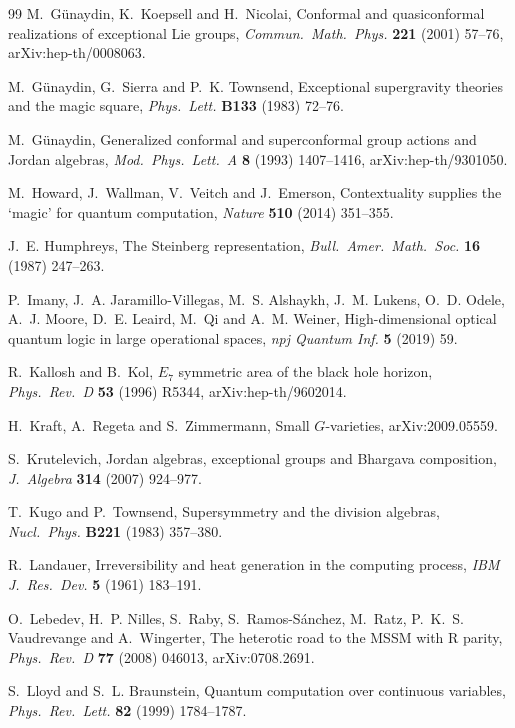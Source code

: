 \begin{thebibliography}{99}
 M.~G\"unaydin, K.~Koepsell and H.~Nicolai, Conformal and quasiconformal
realizations of exceptional Lie groups, \emph{Commun.\ Math.\ Phys.} \textbf{221} (2001)
57--76, arXiv:hep-th/0008063.

 M.~G\"unaydin, G.~Sierra and P.~K. Townsend, Exceptional supergravity
theories and the magic square, \emph{Phys.\ Lett.} \textbf{B133} (1983) 72--76.

 M.~G\"unaydin, Generalized conformal and superconformal group actions
and Jordan algebras, \emph{Mod.\ Phys.\ Lett.\ A} \textbf{8} (1993) 1407--1416,
arXiv:hep-th/9301050.

 M.~Howard, J.~Wallman, V.~Veitch and J.~Emerson, Contextuality supplies
the `magic' for quantum computation, \emph{Nature} \textbf{510} (2014) 351--355.

 J.~E. Humphreys, The Steinberg representation, \emph{Bull.\ Amer.\
Math.\ Soc.} \textbf{16} (1987) 247--263.

 P.~Imany, J.~A. Jaramillo-Villegas, M.~S. Alshaykh, J.~M. Lukens,
O.~D. Odele, A.~J. Moore, D.~E. Leaird, M.~Qi and A.~M. Weiner, High-dimensional optical
quantum logic in large operational spaces, \emph{npj Quantum Inf.} \textbf{5} (2019) 59.

 R.~Kallosh and B.~Kol, $E_7$ symmetric area of the black hole horizon,
\emph{Phys.\ Rev.\ D} \textbf{53} (1996) R5344, arXiv:hep-th/9602014.

 H.~Kraft, A.~Regeta and S.~Zimmermann, Small $G$-varieties,
arXiv:2009.05559.

 S.~Krutelevich, Jordan algebras, exceptional groups and Bhargava
composition, \emph{J.\ Algebra} \textbf{314} (2007) 924--977.

 T.~Kugo and P.~Townsend, Supersymmetry and the division algebras,
\emph{Nucl.\ Phys.} \textbf{B221} (1983) 357--380.

 R.~Landauer, Irreversibility and heat generation in the computing
process, \emph{IBM J.\ Res.\ Dev.} \textbf{5} (1961) 183--191.

 O.~Lebedev, H.~P. Nilles, S.~Raby, S.~Ramos-S\'anchez, M.~Ratz,
P.~K.~S. Vaudrevange and A.~Wingerter, The heterotic road to the MSSM with R parity,
\emph{Phys.\ Rev.\ D} \textbf{77} (2008) 046013, arXiv:0708.2691.

 S.~Lloyd and S.~L. Braunstein, Quantum computation over
continuous variables, \emph{Phys.\ Rev.\ Lett.} \textbf{82} (1999) 1784--1787.


\end{thebibliography}
